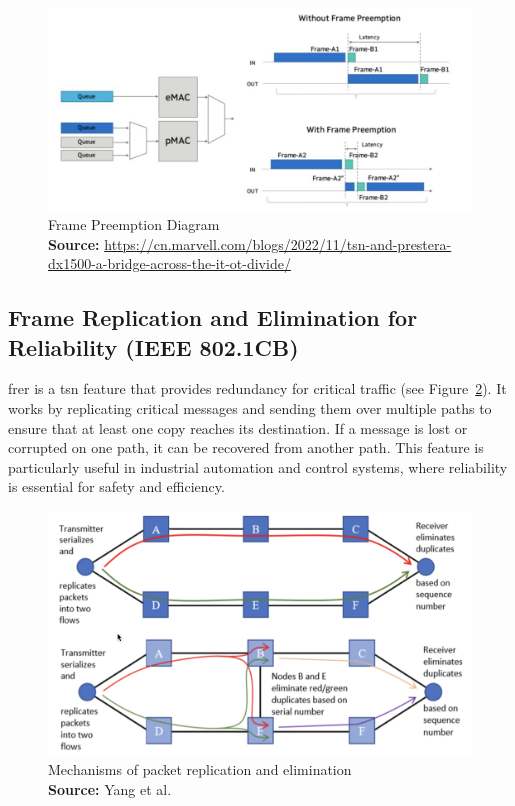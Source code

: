 \documentclass[runningheads]{llncs}
\newcommand*{\captionsource}[2]{%
  \caption[{#1}]{%
    #1%
    \\\hspace{\linewidth}%
    \textbf{Source:} #2%
  }%
}
\begin{document}
\begin{figure}
  \centering
  \includegraphics[width=\linewidth]{frame_preemption}
  \captionsource{Frame Preemption Diagram}{\url{https://cn.marvell.com/blogs/2022/11/tsn-and-prestera-dx1500-a-bridge-across-the-it-ot-divide/}}
  \label{fig:fpem}
\end{figure}

\subsection*{Frame Replication and Elimination for Reliability (IEEE 802.1CB)}
\gls{frer} is a \gls{tsn} feature that provides redundancy for critical traffic (see Figure~\ref{fig:frer}). It works by replicating critical messages and sending them over multiple paths to ensure that at least one copy reaches its destination. If a message is lost or corrupted on one path, it can be recovered from another path. This feature is particularly useful in industrial automation and control systems, where reliability is essential for safety and efficiency.

\begin{figure}
  \centering
  \includegraphics[width=\linewidth]{frer}
  \captionsource{Mechanisms of packet replication and elimination}{Yang et al.~\cite{Yang2019}}
  \label{fig:frer}
\end{figure}
\end{document}
